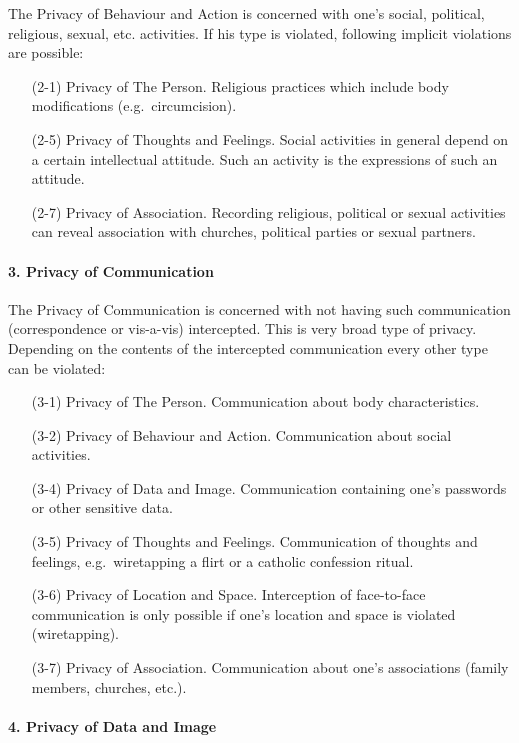 The Privacy of Behaviour and Action is concerned with one's social, political, religious, sexual, etc. activities.
If his type is violated, following implicit violations are possible:

\begin{itemize}
\item [(2-1)] Privacy of The Person.
  Religious practices which include body modifications (e.g.~circumcision).
\item [(2-5)] Privacy of Thoughts and Feelings.
  Social activities in general depend on a certain intellectual attitude.
  Such an activity is the expressions of such an attitude.
\item [(2-7)] Privacy of Association.
  Recording religious, political or sexual activities can reveal association with churches, political parties or sexual partners.
\end{itemize}

\paragraph*{3. Privacy of Communication}

The Privacy of Communication is concerned with not having such communication (correspondence or vis-a-vis) intercepted.
This is very broad type of privacy.
Depending on the contents of the intercepted communication every other type can be violated:

\begin{itemize}
\item [(3-1)] Privacy of The Person. Communication about body characteristics.
\item [(3-2)] Privacy of Behaviour and Action. Communication about social activities.
\item [(3-4)] Privacy of Data and Image.
  Communication containing one's passwords or other sensitive data.
\item [(3-5)] Privacy of Thoughts and Feelings.
  Communication of thoughts and feelings, e.g.~wiretapping a flirt or a catholic confession
  ritual.
\item [(3-6)] Privacy of Location and Space.
  Interception of face-to-face communication is only possible if one's location and space is violated (wiretapping).
\item [(3-7)] Privacy of Association.
  Communication about one's associations (family members, churches, etc.).
\end{itemize}

\paragraph*{4. Privacy of Data and Image}

